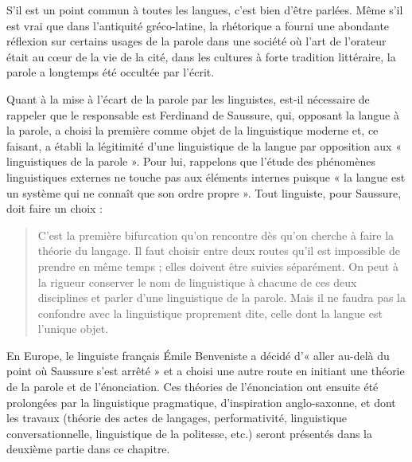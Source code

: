 \begin{keybox}[Introduction]
\renewcommand{\thempfootnote}{校\arabic{editorialnote}}
S’il est un point commun à toutes les langues, c’est bien d’être parlées. Même s’il est vrai que dans l’antiquité gréco-latine, la rhétorique a fourni une abondante réflexion sur certains usages de la parole dans une société où l’art de l’orateur était au cœur de la vie de la cité, dans les cultures à forte tradition littéraire, la parole a longtemps été occultée par l’écrit.

Quant à la mise à l’écart de la parole par les linguistes, est-il nécessaire de rappeler que le responsable est Ferdinand de Saussure, qui, opposant la langue à la parole, a choisi la première comme objet de la linguistique moderne et, ce faisant, a établi la légitimité d’une linguistique de la langue par opposition aux « linguistiques de la parole ». Pour lui, rappelons que l’étude des phénomènes linguistiques externes ne touche pas aux éléments internes puisque « la langue est un système qui ne connaît que son ordre propre ». Tout linguiste, pour Saussure, doit faire un choix :

\begin{quote}
C’est la première bifurcation qu’on rencontre dès qu’on cherche à faire la théorie du langage. Il faut choisir entre deux routes qu’il est impossible de prendre en même temps ; elles doivent être suivies séparément. On peut à la rigueur conserver le nom de linguistique à chacune de ces deux disciplines et parler d’une linguistique de la parole. Mais il ne faudra pas la confondre avec la linguistique proprement dite, celle dont la langue est l’unique objet.
\end{quote}

En Europe, le linguiste français Émile Benveniste a décidé d’« aller au-delà du point où Saussure s’est arrêté » et a choisi une autre route en initiant une théorie de la parole et de l’énonciation. Ces théories de l’énonciation ont ensuite été prolongées par la linguistique pragmatique, d’inspiration anglo-saxonne, et dont les travaux (théorie des actes de langages, performativité, linguistique conversationnelle, linguistique de la politesse, etc.) seront présentés dans la deuxième partie dans ce chapitre.
\end{keybox}

